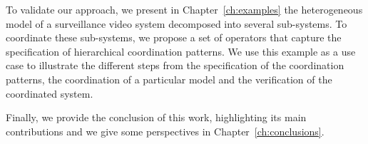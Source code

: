 To validate our approach, we present in Chapter~\ref{ch:examples} the heterogeneous model of a surveillance video system decomposed into several sub-systems. To coordinate these sub-systems, we propose a set of \bcool operators that capture the specification of hierarchical coordination patterns. We use this example as a use case to illustrate the different steps from the specification of the coordination patterns, the coordination of a particular model and the verification of the coordinated system.     

Finally, we provide the conclusion of this work, highlighting its main contributions and we give some perspectives in Chapter~\ref{ch:conclusions}.

	
	







